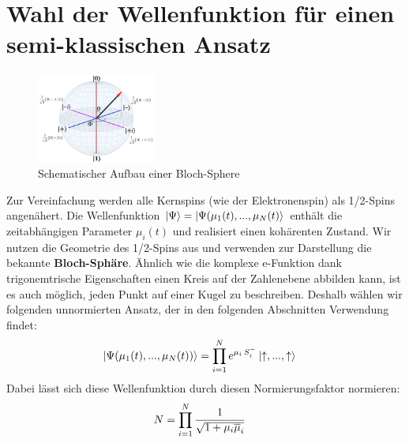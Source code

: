 \section{Wahl der Wellenfunktion für einen semi-klassischen Ansatz}
\begin{figure}
    \centering
    \includegraphics[width = 0.35\textwidth]{Abbildungen/bloch-sphere.png}
    \caption{Schematischer Aufbau einer Bloch-Sphere}
    \label{fig:qubit}
\end{figure}
Zur Vereinfachung werden alle Kernspins (wie der Elektronenspin) als 1/2-Spins angenähert. 
Die Wellenfunktion $\ket{\Psi}=\ket{\Psi(\mu_1(t),...,\mu_N(t)}$ enthält die zeitabhängigen Parameter $\mu_i(t)$ und realisiert einen 
kohärenten Zustand. Wir nutzen die Geometrie des 1/2-Spins aus und verwenden zur Darstellung die bekannte \textbf{Bloch-Sphäre}. 
Ähnlich wie die komplexe e-Funktion dank trigonemtrische Eigenschaften einen Kreis auf der Zahlenebene abbilden kann, ist es auch möglich,
jeden Punkt auf einer Kugel zu beschreiben. Deshalb wählen wir folgenden unnormierten Ansatz, der in den folgenden Abschnitten Verwendung 
findet:
\begin{align}
    \ket{\Psi(\mu_1(t),...,\mu_N(t))} &= \prod_{i=1}^{N} e^{\mu_i\thinspace S_i^-}\ket{\uparrow,...,\uparrow}
\end{align}
Dabei lässt sich diese Wellenfunktion durch diesen Normierungsfaktor normieren:
\begin{align}
    N &= \prod_{i=1}^{N} \frac{1}{\sqrt{1+\mu_i\overline{\mu}_i}}
\end{align}
